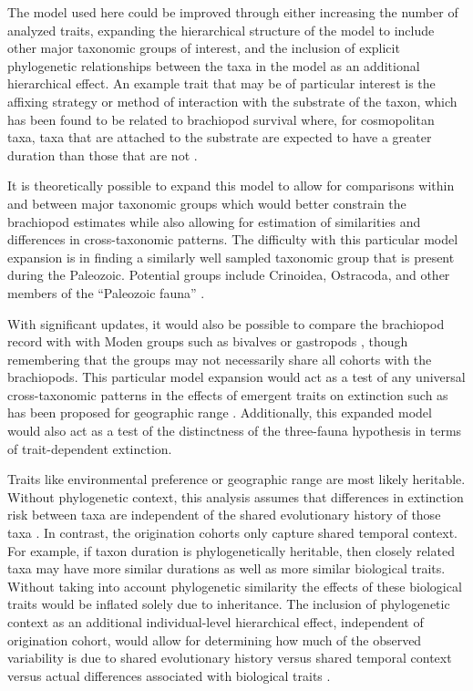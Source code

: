 \documentclass[11pt]{article}
\begin{document}

The model used here could be improved through either increasing the number of analyzed traits, expanding the hierarchical structure of the model to include other major taxonomic groups of interest, and the inclusion of explicit phylogenetic relationships between the taxa in the model as an additional hierarchical effect. An example trait that may be of particular interest is the affixing strategy or method of interaction with the substrate of the taxon, which has been found to be related to brachiopod survival where, for cosmopolitan taxa, taxa that are attached to the substrate are expected to have a greater duration than those that are not \citep{Alexander1977}.

It is theoretically possible to expand this model to allow for comparisons within and between major taxonomic groups which would better constrain the brachiopod estimates while also allowing for estimation of similarities and differences in cross-taxonomic patterns. The difficulty with this particular model expansion is in finding a similarly well sampled taxonomic group that is present during the Paleozoic. Potential groups include Crinoidea, Ostracoda, and other members of the ``Paleozoic fauna'' \citep{Sepkoski1981a}.

With significant updates, it would also be possible to compare the brachiopod record with with Moden groups such as bivalves or gastropods \citep{Sepkoski1981a}, though remembering that the groups may not necessarily share all cohorts with the brachiopods. This particular model expansion would act as a test of any universal cross-taxonomic patterns in the effects of emergent traits on extinction such as has been proposed for geographic range \citep{Payne2007}. Additionally, this expanded model would also act as a test of the distinctness of the \citet{Sepkoski1981a} three-fauna hypothesis in terms of trait-dependent extinction.

Traits like environmental preference or geographic range \citep{Jablonski1987,Hunt2005b} are most likely heritable. Without phylogenetic context, this analysis assumes that differences in extinction risk between taxa are independent of the shared evolutionary history of those  taxa \citep{Felsenstein1985b}. In contrast, the origination cohorts only capture shared temporal context. For example, if taxon duration is phylogenetically heritable, then closely related taxa may have more similar durations as well as more similar biological traits. Without taking into account phylogenetic similarity the effects of these biological traits would be inflated solely due to inheritance. The inclusion of phylogenetic context as an additional individual-level hierarchical effect, independent of origination cohort, would allow for determining how much of the observed variability is due to shared evolutionary history versus shared temporal context versus actual differences associated with biological traits \citep{Smits2015}.
\end{document}
